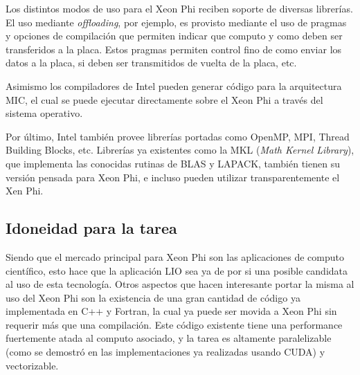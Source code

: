 Los distintos modos de uso para el Xeon Phi reciben soporte de diversas librer\'ias. El uso mediante \textit{offloading}, por ejemplo,
es provisto mediante el uso de pragmas y opciones de compilaci\'on que permiten indicar que computo y como deben ser transferidos
a la placa. Estos pragmas permiten control fino de como enviar los datos a la placa, si deben ser transmitidos de vuelta de la placa,
etc.

Asimismo los compiladores de Intel pueden generar c\'odigo para la arquitectura MIC, el cual se puede ejecutar directamente sobre
el Xeon Phi a trav\'es del sistema operativo. 

Por \'ultimo, Intel tambi\'en provee librer\'ias portadas como OpenMP, MPI, Thread Building Blocks, etc. Librer\'ias ya existentes
como la MKL (\textit{Math Kernel Library}), que implementa las conocidas rutinas de BLAS y LAPACK, tambi\'en tienen su versi\'on
pensada para Xeon Phi, e incluso pueden utilizar transparentemente el Xen Phi.

\subsection{Idoneidad para la tarea}

Siendo que el mercado principal para Xeon Phi son las aplicaciones de computo cient\'ifico, esto hace que la 
aplicaci\'on LIO sea ya de por si una posible candidata al uso de esta tecnolog\'ia. Otros aspectos que
hacen interesante portar la misma al uso del Xeon Phi son la existencia de una gran cantidad de c\'odigo ya
implementada en C++ y Fortran, la cual ya puede ser movida a Xeon Phi sin requerir m\'as que una compilaci\'on. 
Este c\'odigo existente tiene una performance fuertemente atada al computo asociado,
y la tarea es altamente paralelizable (como se demostr\'o en las implementaciones ya realizadas usando CUDA) y
vectorizable. 
